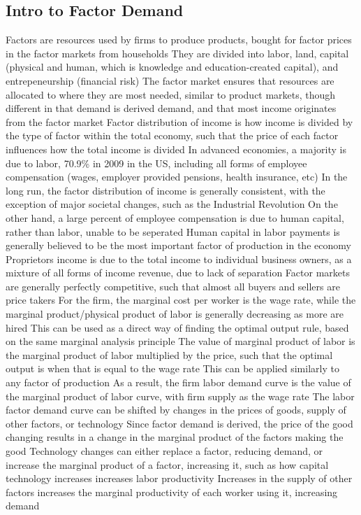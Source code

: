 \documentclass[11 pt, twoside]{article}
\newenvironment{outline*}
{
	\begin{outline}[enumerate]
	}
	{\end{outline}
}
\begin{document}
\subsection{Intro to Factor Demand}
\begin{outline*}
\1 Factors are resources used by firms to produce products, bought for factor prices in the factor markets from households
\2 They are divided into labor, land, capital (physical and human, which is knowledge and education-created capital), and entrepeneurship (financial risk)
\1 The factor market ensures that resources are allocated to where they are most needed, similar to product markets, though different in that demand is derived demand, and that most income originates from the factor market
\2 Factor distribution of income is how income is divided by the type of factor within the total economy, such that the price of each factor influences how the total income is divided
\2 In advanced economies, a majority is due to labor, 70.9\% in 2009 in the US, including all forms of employee compensation (wages, employer provided pensions, health insurance, etc)
\3 In the long run, the factor distribution of income is generally consistent, with the exception of major societal changes, such as the Industrial Revolution
\3 On the other hand, a large percent of employee compensation is due to human capital, rather than labor, unable to be seperated
\3 Human capital in labor payments is generally believed to be the most important factor of production in the economy
\2 Proprietors income is due to the total income to individual business owners, as a mixture of all forms of income revenue, due to lack of separation
\1 Factor markets are generally perfectly competitive, such that almost all buyers and sellers are price takers
\2 For the firm, the marginal cost per worker is the wage rate, while the marginal product/physical product of labor is generally decreasing as more are hired
\2 This can be used as a direct way of finding the optimal output rule, based on the same marginal analysis principle
\3 The value of marginal product of labor is the marginal product of labor multiplied by the price, such that the optimal output is when that is equal to the wage rate
\3 This can be applied similarly to any factor of production
\2 As a result, the firm labor demand curve is the value of the marginal product of labor curve, with firm supply as the wage rate
\1 The labor factor demand curve can be shifted by changes in the prices of goods, supply of other factors, or technology
\2 Since factor demand is derived, the price of the good changing results in a change in the marginal product of the factors making the good
\2 Technology changes can either replace a factor, reducing demand, or increase the marginal product of a factor, increasing it, such as how capital technology increases increases labor productivity
\2 Increases in the supply of other factors increases the marginal productivity of each worker using it, increasing demand
\end{outline*}
\end{document}
